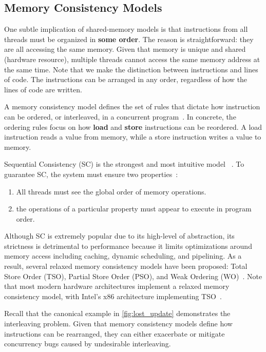 \subsection{Memory Consistency Models}
One subtle implication of shared-memory models is that instructions
from all threads must be organized in \textbf{some order}. The reason is straightforward:
they are all accessing the same memory. Given that memory is unique and shared (hardware resource),
multiple threads cannot access the same memory address at the same time. Note that
we make the distinction between instructions and lines of code. The instructions
can be arranged in any order, regardless of how the lines of code are written.

A memory consistency model defines the set of rules that dictate how
instruction can be ordered, or interleaved, in a concurrent
program~\cite{bornholt2016memoryModels,jaffe2011impactOfMemoryModels}.
In concrete, the ordering rules focus on how \textbf{load} and \textbf{store} instructions
can be reordered. A load instruction reads a value from memory,
while a store instruction writes a value to memory.

Sequential Consistency (SC) is the strongest
and most intuitive model ~\cite{lamport1979multiprocessor}.
To guarantee SC, the system must ensure two properties~\cite{jaffe2011impactOfMemoryModels}:
\begin{enumerate}
    \item All threads must see the global order of memory operations.
    \item the operations of a particular property must appear to execute
    in program order.
\end{enumerate}

Although SC is extremely popular due to its high-level of abstraction,
its strictness is detrimental to performance because it limits
optimizations around memory access including caching,
dynamic scheduling, and pipelining. As a result, several relaxed
memory consistency models have been proposed:
Total Store Order (TSO), Partial Store Order (PSO),
and Weak Ordering (WO)~\cite{jaffe2011impactOfMemoryModels}.
Note that most modern hardware architectures implement a relaxed
memory consistency model, with Intel's x86 architecture implementing TSO~\cite{cox2021hardwareMemoryModels}.

Recall that the canonical example in \autoref{fig:lost_update}
demonstrates the interleaving problem. Given that memory
consistency models define how instructions can be rearranged,
they can either exacerbate or mitigate concurrency bugs
caused by undesirable interleaving.

